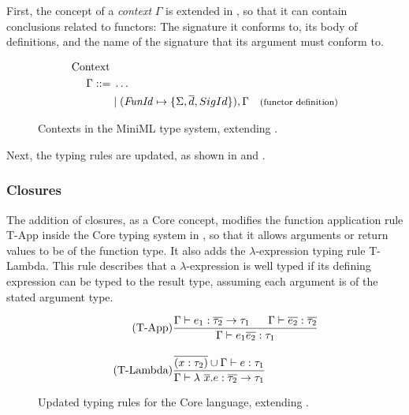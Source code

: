 First, the concept of a \emph{context} $\Gamma$ is extended in , so that it can contain conclusions related to functors: The signature it conforms to, its body of definitions, and the name of the signature that its argument must conform to.

\begin{figure}[!htb]
\begin{align*}
\begin{aligned}
\text{Context }\\
\Gamma ::=\; & \ldots \\ 
&| \; (\mathit{FunId} \mapsto \lbrace \Sigma, \overline{d}, SigId\rbrace), \Gamma
                                           & {\text{\footnotesize(functor definition)}}
\end{aligned}
\end{align*}
\caption[Updated Contexts]{Contexts in the MiniML type system, extending .}
\label{fig:UpdatedMiniMLContexts}
\end{figure}

Next, the typing rules are updated, as shown in  and .

\subsubsection{Closures}
The addition of closures, as a Core concept, modifies the function application rule T-App inside the Core typing system in , so that it allows arguments or return values to be of the function type.
It also adds the $\lambda$-expression typing rule T-Lambda. 
This rule describes that a $\lambda$-expression is well typed if its defining expression can be typed to the result type, assuming each argument is of the stated argument type.

\begin{figure}[htb]
\begin{align*}
\tag{T-App}
&\frac
{\Gamma \vdash e_{1}:\overline{\tau_{2}} \rightarrow \tau_{1}
    \;\;\;\;\;\;
    \Gamma \vdash \overline{e_{2}}:\overline{\tau_{2}}}
{\Gamma \vdash e_{1} \overline{e_{2}}:\tau_{1}}
\\[1em]
\tag{T-Lambda}
&\frac
{\overline{(x:\tau_{2})} \cup \Gamma \vdash e : \tau_{1}}
{\Gamma \vdash \lambda\ \overline{x}.e : \overline{\tau_{2}} \rightarrow \tau_{1}}
\end{align*}
\caption[Updated Typing Rules: Core Language]{Updated typing rules for the Core language, extending . \label{fig:UpdatedTypeRulesCore}}
\end{figure}

